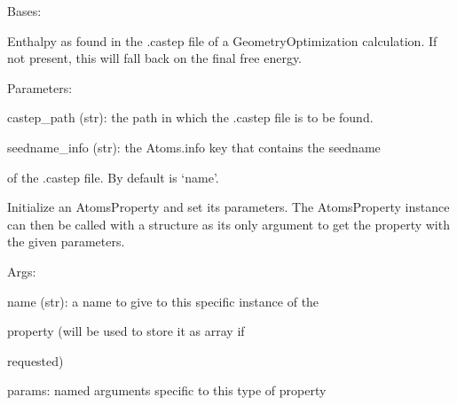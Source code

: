 \documentclass[letterpaper,10pt,english]{sphinxmanual}
\begin{document}
\begin{fulllineitems}
\label{doctree/soprano.properties.castep.castep:soprano.properties.castep.castep.CastepEnthalpy}
Bases: {\hyperref[doctree/soprano.properties.atomsproperty:soprano.properties.atomsproperty.AtomsProperty]{}}

Enthalpy as found in the .castep file of a GeometryOptimization
calculation. If not present, this will fall back on the final free energy.

\begin{DUlineblock}{0em}
\item[] Parameters:
\item[]
\begin{DUlineblock}{\DUlineblockindent}
\item[] castep\_path (str): the path in which the .castep file is to be found.
\item[] seedname\_info (str): the Atoms.info key that contains the seedname
\item[]
\begin{DUlineblock}{\DUlineblockindent}
\item[] of the .castep file. By default is `name'.
\end{DUlineblock}
\end{DUlineblock}
\end{DUlineblock}

Initialize an AtomsProperty and set its parameters.
The AtomsProperty instance can then be called with a structure as its
only argument to get the property with the given parameters.

\begin{DUlineblock}{0em}
\item[] Args:
\item[]
\begin{DUlineblock}{\DUlineblockindent}
\item[] name (str): a name to give to this specific instance of the
\item[]
\begin{DUlineblock}{\DUlineblockindent}
\item[] property (will be used to store it as array if
\item[] requested)
\end{DUlineblock}
\item[] params: named arguments specific to this type of property
\end{DUlineblock}
\end{DUlineblock}


\end{fulllineitems}
\end{document}
